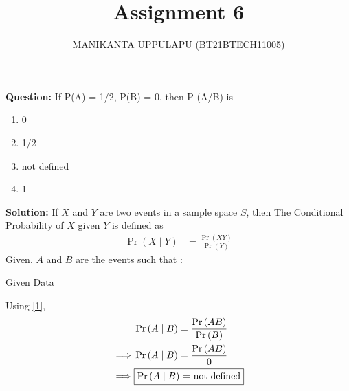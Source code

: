 \documentclass[journal,12pt,twocolumn]{IEEEtran}
\title{Assignment 6}
\author{MANIKANTA UPPULAPU (BT21BTECH11005)}
\providecommand{\pr}[1]{\ensuremath{\Pr\left(#1\right)}}
\newcommand{\question}{\noindent \textbf{Question: }}
\newcommand{\solution}{\noindent \textbf{Solution: }}
\begin{document}
    \maketitle  
    
    \question If P(A) = 1/2, P(B) = 0, then P (A/B) is
    \begin{enumerate}
        \item 0 
        \item 1/2
        \item not defined
        \item 1
    \end{enumerate}
    
    \solution 
     If $X$ and $Y$ are two events in a sample space $S$, then The Conditional Probability of $X$ given $Y$ is defined as
        \begin{align}
        \label{1}  \pr{X \mid Y} &= \frac{\pr{XY}}{\pr{Y}}  
        \end{align}
        Given, $A$ and $B$ are the events such that :
        \begin{table}[ht!]
        \centering
           
        \caption{Given Data}
	        \label{Tables:Table}
        \end{table}
        \begin{enumerate}
             Using \eqref{1},
            \begin{align}
                &\pr{A \mid B} = \frac{\pr{AB}}{\pr{B}}\label{2} \\
                \implies &\pr{A \mid B} = \frac{{\pr{AB}}}{{0}}\label{3} \\
                \implies &\fbox{\pr{A \mid B} = \text{not defined}}\label{4} 
            \end{align}
            \end{enumerate}
            
\end{document}
